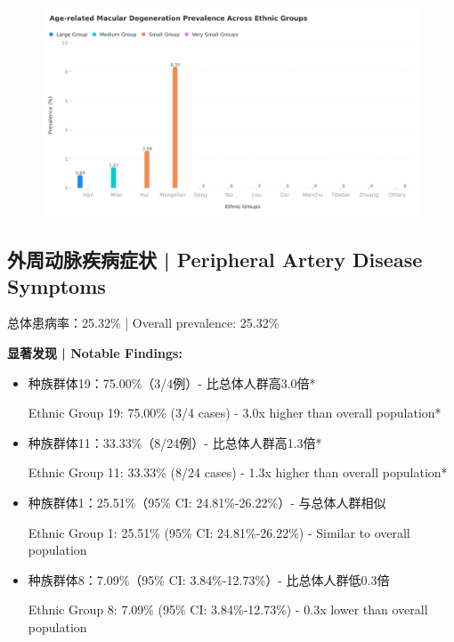 \documentclass[12pt,a4paper]{article}
\begin{document}
\begin{figure}[H]
\hspace{-2cm}
\includegraphics[width=1.2\textwidth]{all/interactive_chart_amd.png}
\end{figure}


\subsection{外周动脉疾病症状 | Peripheral Artery Disease Symptoms}

总体患病率：25.32\% | Overall prevalence: 25.32\%

\textbf{显著发现 | Notable Findings:}
\begin{itemize}
    \item 种族群体19：75.00\%（3/4例）- 比总体人群高3.0倍*
    
    Ethnic Group 19: 75.00\% (3/4 cases) - 3.0x higher than overall population*
    
    \item 种族群体11：33.33\%（8/24例）- 比总体人群高1.3倍*
    
    Ethnic Group 11: 33.33\% (8/24 cases) - 1.3x higher than overall population*
    
    \item 种族群体1：25.51\%（95\% CI: 24.81\%-26.22\%）- 与总体人群相似
    
    Ethnic Group 1: 25.51\% (95\% CI: 24.81\%-26.22\%) - Similar to overall population
    
    \item 种族群体8：7.09\%（95\% CI: 3.84\%-12.73\%）- 比总体人群低0.3倍
    
    Ethnic Group 8: 7.09\% (95\% CI: 3.84\%-12.73\%) - 0.3x lower than overall population
\end{itemize}
\end{document}
